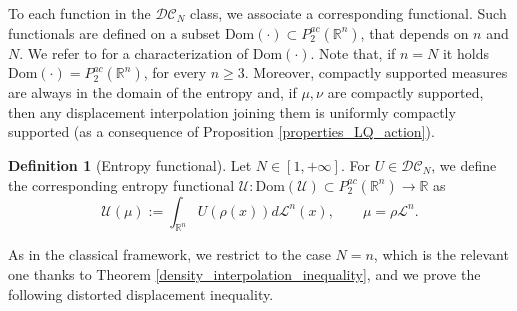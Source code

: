 \documentclass[reqno]{amsart}
\theoremstyle{plain}
\theoremstyle{definition}
\newtheorem{Def}[thm]{Definition}
\theoremstyle{remark}
\begin{document}
To each function in the $\mathcal{DC}_N$ class, we associate a corresponding functional. Such functionals are defined on a subset $\mathrm{Dom}(\cdot)\subset P_2^{ac}(\mathbb{R}^n)$, that depends on $n$ and $N$. We refer to \cite[Theorem 17.8]{Villanioldandnew} for a characterization of $\mathrm{Dom}(\cdot)$. Note that, if $n=N$ it holds $\mathrm{Dom}(\cdot)=P_2^{ac}(\mathbb{R}^n)$, for every $n\geq 3$. Moreover, compactly supported measures are always in the domain of the entropy and, if $\mu, \nu$ are compactly supported, then any displacement interpolation joining them is uniformly compactly supported (as a consequence of Proposition \ref{properties_LQ_action}).
		\begin{Def}[Entropy functional] Let $N\in[1,+\infty]$.
			For $U\in\mathcal{DC}_N$, we define the corresponding entropy functional $\mathcal{U}:\mathrm{Dom}(\mathcal{U})\subset P_2^{ac}(\mathbb{R}^n)\to\mathbb{R}$ as 
			\begin{equation}
				\mathcal{U}(\mu):=\int_{\mathbb{R}^n}U(\rho(x))d\mathscr{L}^n(x),\qquad \mu=\rho\mathscr{L}^n.
			\end{equation}
		\end{Def}
            As in the classical framework, we restrict to the case $N=n$, which is the relevant one thanks to Theorem \ref{density_interpolation_inequality}, and we prove the following distorted displacement inequality.
\end{document}
